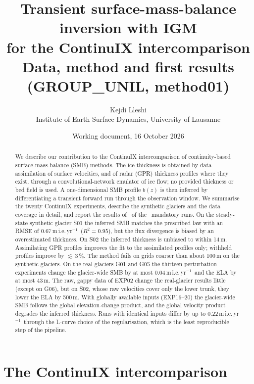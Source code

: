 \documentclass[10pt,a4paper]{article}
\title{\textbf{Transient surface-mass-balance inversion with IGM\\for the ContinuIX intercomparison}\\[4pt]
\large Data, method and first results (GROUP\_UNIL, method01)}
\author{Kejdi Lleshi\\ \small Institute of Earth Surface Dynamics, University of Lausanne}
\date{\small Working document, 16 October 2026}
\newcommand{\mie}{m\,i.e.\,yr$^{-1}$}
\begin{document}
\maketitle

\begin{abstract}
\noindent We describe our contribution to the ContinuIX intercomparison of continuity-based surface-mass-balance (SMB)
methods. The ice thickness is obtained by data assimilation of surface velocities, and of radar (GPR) thickness profiles
where they exist, through a convolutional-network emulator of ice flow; no provided thickness or bed field is used.
A one-dimensional SMB profile $b(z)$ is then inferred by differentiating a transient forward run through the
observation window. We summarise the twenty ContinuIX experiments, describe the synthetic glaciers and the data
coverage in detail, and report the results of \NDone\ of the \NQueue\ mandatory runs. On the steady-state synthetic
glacier S01 the inferred SMB matches the prescribed law with an RMSE of 0.67\,\mie\ ($R^2=0.95$), but the
flux divergence is biased by an overestimated thickness. On S02 the inferred thickness is unbiased to within
14\,m. Assimilating GPR profiles improves the fit to the assimilated profiles only; withheld profiles improve by
$\lesssim$\,3\,\%. The method fails on
grids coarser than about 100\,m on the synthetic glaciers. On the real glaciers G01 and G05 the thirteen perturbation
experiments change the glacier-wide SMB by at most 0.04\,\mie\ and the ELA by at most 43\,m. The raw, gappy data of EXP02 change the real-glacier results little (except on G06), but on S02, whose raw velocities
cover only the lower trunk, they lower the ELA by 500\,m. With globally available inputs
(EXP16--20) the glacier-wide SMB follows the global elevation-change product, and the global velocity product degrades
the inferred thickness. Runs with identical inputs differ by up to 0.22\,\mie\ through the L-curve choice of the
regularisation, which is the least reproducible step of the pipeline.
\end{abstract}

\section{The ContinuIX intercomparison}
\end{document}
